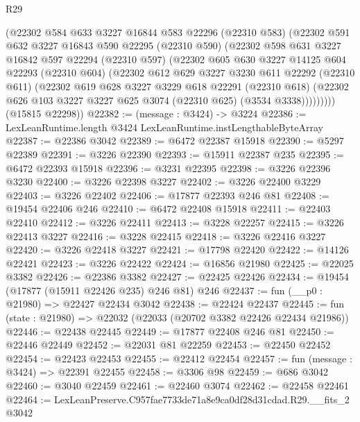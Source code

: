 \begin{lexlean}{R29}
\begin{coremodule}
        (@22302
          @584
          @633
          @3227
          @16844
          @583
          @22296
          (@22310 @583)
          (@22302
            @591
            @632
            @3227
            @16843
            @590
            @22295
            (@22310 @590)
            (@22302
              @598
              @631
              @3227
              @16842
              @597
              @22294
              (@22310 @597)
              (@22302
                @605
                @630
                @3227
                @14125
                @604
                @22293
                (@22310 @604)
                (@22302
                  @612
                  @629
                  @3227
                  @3230
                  @611
                  @22292
                  (@22310 @611)
                  (@22302
                    @619
                    @628
                    @3227
                    @3229
                    @618
                    @22291
                    (@22310 @618)
                    (@22302 @626 @103 @3227 @3227 @625 @3074 (@22310 @625) (@3534 @3338)))))))))
      (@15815 @22298))
@22382 := (message : @3424) -> @3224
@22386 := LexLeanRuntime.length @3424 LexLeanRuntime.instLengthableByteArray
@22387 := @22386 @3042
@22389 := @6472 @22387 @15918
@22390 := @5297 @22389
@22391 := @3226 @22390
@22393 := @15911 @22387 @235
@22395 := @6472 @22393 @15918
@22396 := @3231 @22395
@22398 := @3226 @22396 @3230
@22400 := @3226 @22398 @3227
@22402 := @3226 @22400 @3229
@22403 := @3226 @22402
@22406 := @17877 @22393 @246 @81
@22408 := @19454 @22406 @246
@22410 := @6472 @22408 @15918
@22411 := @22403 @22410
@22412 := @3226 @22411
@22413 := @3228 @22257
@22415 := @3226 @22413 @3227
@22416 := @3228 @22415
@22418 := @3226 @22416 @3227
@22420 := @3226 @22418 @3227
@22421 := @17798 @22420
@22422 := @14126 @22421
@22423 := @3226 @22422
@22424 := @16856 @21980
@22425 := @22025 @3382
@22426 := @22386 @3382
@22427 := @22425 @22426
@22434 := @19454 (@17877 (@15911 @22426 @235) @246 @81) @246
@22437 := fun (__p0 : @21980) => @22427 @22434 @3042
@22438 := @22424 @22437
@22445 := fun (state : @21980) => @22032 (@22033 (@20702 @3382 @22426 @22434 @21986))
@22446 := @22438 @22445
@22449 := @17877 @22408 @246 @81
@22450 := @22446 @22449
@22452 := @22031 @81 @22259
@22453 := @22450 @22452
@22454 := @22423 @22453
@22455 := @22412 @22454
@22457 := fun (message : @3424) => @22391 @22455
@22458 := @3306 @98
@22459 := @686 @3042
@22460 := @3040 @22459
@22461 := @22460 @3074
@22462 := @22458 @22461
@22464 := LexLeanPreserve.C957fae7733de71a8e9ca0df28d31cdad.R29.__fits_2 @3042

\end{coremodule}
\end{lexlean}
